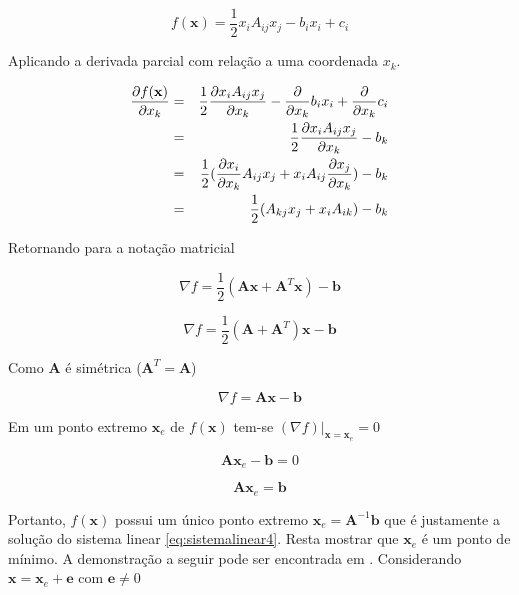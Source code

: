 \begin{equation} \label{eq:quadratica_ind}
    f(\mathbf{x}) = \frac{1}{2} x_i A_{ij} x_j - b_i x_i + c_i
\end{equation}


Aplicando a derivada parcial com relação a uma coordenada $x_k$.


\begin{eqnarray}
     \dxk[f(\mathbf{x})] & = & \frac{1}{2} \dxk[ x_i A_{ij} x_j ]- \dxk{b_i x_i}+ \dxk{c_i} \\
                & = & \frac{1}{2} \dxk[ x_i A_{ij} x_j ]- b_k \\
                & = & \frac{1}{2} (\dxk[ x_i ]A_{ij} x_j  + x_i A_{ij} \dxk[x_j]) - b_k \\
                & = & \frac{1}{2}(A_{kj} x_j  + x_i A_{ik})  - b_k
\end{eqnarray}


Retornando para a notação matricial


\begin{equation}
    \nabla f = \frac{1}{2} (\mathbf{A}\mathbf{x} + \mathbf{A}^T \mathbf{x}) - \mathbf{b}
\end{equation}


\begin{equation}
    \nabla f = \frac{1}{2} (\mathbf{A} + \mathbf{A}^T) \mathbf{x} - \mathbf{b}
\end{equation}

Como $\mathbf{A}$ é simétrica ($\mathbf{A}^T = \mathbf{A}$)

\begin{equation} \label{eq:gradf}
    \nabla f = \mathbf{A} \mathbf{x} - \mathbf{b}
\end{equation}

Em um ponto extremo  $ \mathbf{x}_e$ de $f(\mathbf{x})$ tem-se $(\nabla f)|_{\mathbf{x}=\mathbf{x}_e} = 0 $

\begin{equation}
    \mathbf{A}\mathbf{x}_e - \mathbf{b} = 0
\end{equation}

\begin{equation}
    \mathbf{A}\mathbf{x}_e = \mathbf{b}
\end{equation}

Portanto, $f(\mathbf{x})$ possui um único ponto extremo $\mathbf{x}_e = \mathbf{A}^{-1}\mathbf{b}$ que é justamente a solução do sistema linear \eqref{eq:sistemalinear4}. Resta mostrar que $\mathbf{x}_e$ é um ponto de mínimo. A demonstração a seguir pode ser encontrada em \citet{Shewchuk94anintroduction}. Considerando $\mathbf{x} = \mathbf{x}_e + \mathbf{e}$ com $\mathbf{e} \neq 0 $


